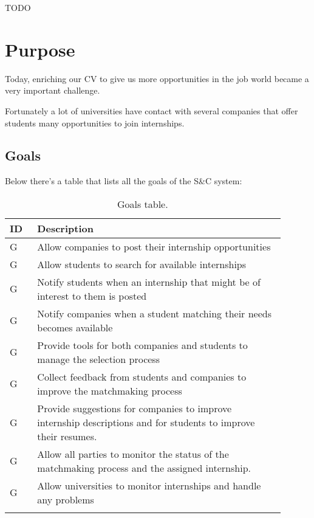 TODO

\newpage

\section{Purpose}
\label{sec:purpose}%
Today, enriching our CV to give us more opportunities in the job world became a very important challenge. 

Fortunately a lot of universities have contact with several companies that offer students many opportunities to join internships.


\subsection{Goals}
\label{subsec:goals}%
\setcounter{g}{1}
\newcommand{\cg}{\theg\stepcounter{g}}

Below there's a table that lists all the goals of the S\&C system:
\begin{center}
    \begin{longtable}{ |l|p{0.9\linewidth}| }
        \hline
        \textbf{ID} & \textbf{Description}                                                                   \\
        \hline
        G\cg        &   Allow companies to post their internship opportunities\\
        \hline
        G\cg        &   Allow students to search for available internships\\
        \hline
        G\cg        &  Notify students when an internship that might be of interest to them is posted\\
        \hline
        G\cg        &   Notify companies when a student matching their needs becomes available\\
        \hline
        G\cg        &  Provide tools for both companies and students to manage the selection process\\
        \hline
        G\cg        &  Collect feedback from students and companies to improve the matchmaking process\\
        \hline
        G\cg        &  Provide suggestions for companies to improve internship descriptions and for students to improve their resumes.\\
        \hline
        G\cg        &  Allow all parties to monitor the status of the matchmaking process and the assigned internship.\\
        \hline
        G\cg        &  Allow universities to monitor internships and handle any problems\\
        \hline
        \caption{Goals table.}
        \label{tab:goals_tab}%
    \end{longtable}
\end{center}


